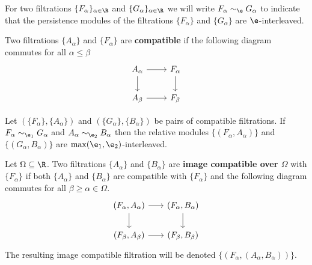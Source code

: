 
For two filtrations $\{F_\alpha\}_{\alpha\in\R}$ and $\{G_\alpha\}_{\alpha\in\R}$ we will write $F_\alpha\sim_\e G_\alpha$ to indicate that the persistence modules of the filtrations $\{F_\alpha\}$ and $\{G_\alpha\}$ are $\e$-interleaved.

\begin{definition}
  Two filtrations $\{A_\alpha\}$ and $\{F_\alpha\}$ are \textbf{compatible} if the following diagram commutes for all $\alpha\leq\beta$
  \begin{equation}\begin{tikzcd}
    A_\alpha\arrow{r}\arrow{d} &
    F_\alpha\arrow{d} \\
    A_\beta\arrow{r} &
    F_\beta
  \end{tikzcd}\end{equation}
\end{definition}

\begin{theorem}
  Let $(\{F_\alpha\}, \{A_\alpha\})$ and $(\{G_\alpha\}, \{B_\alpha\})$ be pairs of compatible filtrations.
  If $F_\alpha\sim_{\e_1} G_\alpha$ and $A_\alpha\sim_{\e_2} B_\alpha$ then the relative modules $\{(F_\alpha, A_\alpha)\}$ and $\{(G_\alpha, B_\alpha)\}$ are $\max(\e_1, \e_2)$-interleaved.
\end{theorem}

\begin{definition}
  Let $\Omega\subseteq\R$.
  Two filtrations $\{A_\alpha\}$ and $\{B_\alpha\}$ are \textbf{image compatible over $\Omega$} with $\{F_\alpha\}$ if both $\{A_\alpha\}$ and $\{B_\alpha\}$ are compatible with $\{F_\alpha\}$ and the following diagram commutes for all $\beta\geq\alpha\in\Omega$.
  \begin{equation}\label{dgm:fab}
  \begin{tikzcd}[column sep=scriptsize]
    (F_\alpha, A_\alpha)\arrow{r}\arrow{d} &
    (F_\alpha, B_\alpha)\arrow{d}\\
    (F_\beta, A_\beta)\arrow{r} &
    (F_\beta, B_\beta)
  \end{tikzcd}\end{equation}
  The resulting image compatible filtration will be denoted $\{(F_\alpha, (A_\alpha, B_\alpha))\}$.
\end{definition}

